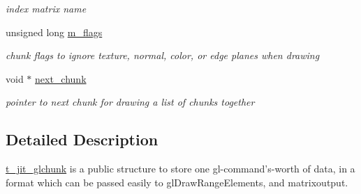 \begin{DoxyCompactItemize}
\begin{DoxyCompactList}\small\item\em index matrix name \item\end{DoxyCompactList}\item 
\hypertarget{structt__jit__glchunk_a28c40c66e9d75176f370d346d33f5c08}{
unsigned long \hyperlink{structt__jit__glchunk_a28c40c66e9d75176f370d346d33f5c08}{m\_\-flags}}
\label{structt__jit__glchunk_a28c40c66e9d75176f370d346d33f5c08}

\begin{DoxyCompactList}\small\item\em chunk flags to ignore texture, normal, color, or edge planes when drawing \item\end{DoxyCompactList}\item 
\hypertarget{structt__jit__glchunk_ac6dbf1b5dd7d3cfdb7451de93e89ca04}{
void $\ast$ \hyperlink{structt__jit__glchunk_ac6dbf1b5dd7d3cfdb7451de93e89ca04}{next\_\-chunk}}
\label{structt__jit__glchunk_ac6dbf1b5dd7d3cfdb7451de93e89ca04}

\begin{DoxyCompactList}\small\item\em pointer to next chunk for drawing a list of chunks together \item\end{DoxyCompactList}\end{DoxyCompactItemize}


\subsection{Detailed Description}
\hyperlink{structt__jit__glchunk}{t\_\-jit\_\-glchunk} is a public structure to store one gl-\/command's-\/worth of data, in a format which can be passed easily to glDrawRangeElements, and matrixoutput. 